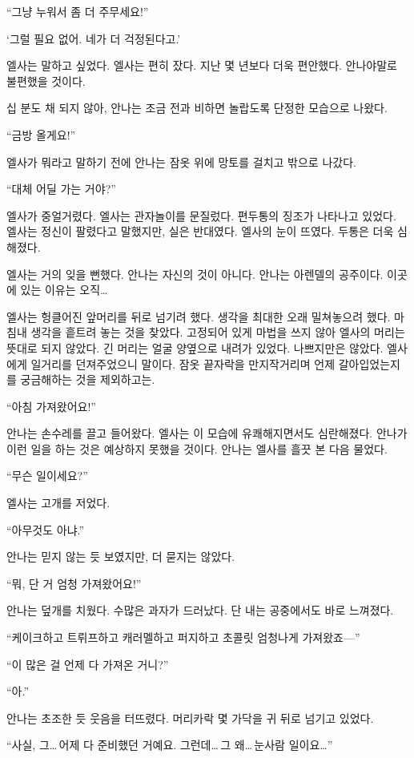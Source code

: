 ``그냥 누워서 좀 더 주무세요!''

`그럴 필요 없어. 네가 더 걱정된다고.'

엘사는 말하고 싶었다. 엘사는 편히 잤다. 지난 몇 년보다 더욱 편안했다. 안나야말로 불편했을 것이다.

십 분도 채 되지 않아, 안나는 조금 전과 비하면 놀랍도록 단정한 모습으로 나왔다.

``금방 올게요!''

엘사가 뭐라고 말하기 전에 안나는 잠옷 위에 망토를 걸치고 밖으로 나갔다.

``대체 어딜 가는 거야?''

엘사가 중얼거렸다. 엘사는 관자놀이를 문질렀다. 편두통의 징조가 나타나고 있었다. 엘사는 정신이 팔렸다고 말했지만, 실은 반대였다. 엘사의 눈이 뜨였다. 두통은 더욱 심해졌다.

엘사는 거의 잊을 뻔했다. 안나는 자신의 것이 아니다. 안나는 아렌델의 공주이다. 이곳에 있는 이유는 오직\ldots

엘사는 헝클어진 앞머리를 뒤로 넘기려 했다. 생각을 최대한 오래 밀쳐놓으려 했다. 마침내 생각을 흩트려 놓는 것을 찾았다. 고정되어 있게 마법을 쓰지 않아 엘사의 머리는 뜻대로 되지 않았다. 긴 머리는 얼굴 양옆으로 내려가 있었다. 나쁘지만은 않았다. 엘사에게 일거리를 던져주었으니 말이다. 잠옷 끝자락을 만지작거리며 언제 갈아입었는지를 궁금해하는 것을 제외하고는.

``아침 가져왔어요!''

안나는 손수레를 끌고 들어왔다. 엘사는 이 모습에 유쾌해지면서도 심란해졌다. 안나가 이런 일을 하는 것은 예상하지 못했을 것이다. 안나는 엘사를 흘끗 본 다음 물었다.

``무슨 일이세요?''

엘사는 고개를 저었다.

``아무것도 아냐.''

안나는 믿지 않는 듯 보였지만, 더 묻지는 않았다.

``뭐, 단 거 엄청 가져왔어요!''

안나는 덮개를 치웠다. 수많은 과자가 드러났다. 단 내는 공중에서도 바로 느껴졌다.

``케이크하고 트뤼프하고 캐러멜하고 퍼지하고 초콜릿 엄청나게 가져왔죠—''

``이 많은 걸 언제 다 가져온 거니?''

``아.''

안나는 초조한 듯 웃음을 터뜨렸다. 머리카락 몇 가닥을 귀 뒤로 넘기고 있었다.

``사실, 그\ldots\,어제 다 준비했던 거예요. 그런데\ldots\,그 왜\ldots\,눈사람 일이요\ldots''

